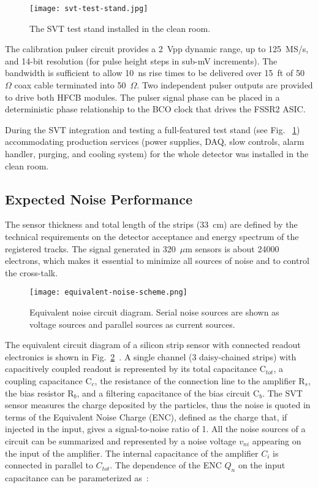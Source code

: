\begin{figure}[hbt] 
\centering 
\texttt{[image: svt-test-stand.jpg]}
\caption{The SVT test stand installed in the clean room.}
\label{fig:svt-test-stand}
\end{figure}

The calibration pulser circuit provides a 2~Vpp dynamic range, up to 125~MS/s, and 14-bit resolution (for pulse
height steps in sub-mV increments). The bandwidth is sufficient to allow 10~ns rise times to be delivered over
15~ft of 50~$\Omega$ coax cable terminated into 50~$\Omega$. Two independent pulser outputs are provided
to drive both HFCB modules. The pulser signal phase can be placed in a deterministic phase relationship to the BCO
clock that drives the FSSR2 ASIC. 

During the SVT integration and testing a full-featured test stand (see Fig. ~\ref{fig:svt-test-stand}) accommodating
production services (power supplies, DAQ, slow controls, alarm handler, purging, and cooling system) for the whole
detector was installed in the clean room.

\subsection{Expected Noise Performance}

The sensor thickness and total length of the strips (33~cm) are defined by the technical requirements on the
detector acceptance and energy spectrum of the registered tracks. The signal generated in 320~$\mu$m sensors
is about 24000 electrons, which makes it essential to minimize all sources of noise and to control the cross-talk. 

\begin{figure}[hbt] 
\centering 
\texttt{[image: equivalent-noise-scheme.png]}
\caption{Equivalent noise circuit diagram. Serial noise sources are shown as voltage sources and
parallel sources as current sources.}
\label{fig:equivalent-noise-scheme}
\end{figure}

The equivalent circuit diagram of a silicon strip sensor with connected readout electronics is shown in
Fig.~\ref{fig:equivalent-noise-scheme}~\cite{SPIELER}. A single channel (3 daisy-chained strips) with capacitively
coupled readout is represented by its total capacitance C$_{tot}$, a coupling capacitance C$_c$, the resistance of
the connection line to the amplifier R$_s$, the bias resistor R$_b$, and a filtering capacitance of the bias circuit
C$_b$. The SVT sensor measures the charge deposited by the particles, thus the noise is quoted in terms of the
Equivalent Noise Charge (ENC), defined as the charge that, if injected in the input, gives a signal-to-noise ratio of 1.
All the noise sources of a circuit can be summarized and represented by a noise voltage $v_{ni}$ appearing on the
input of the amplifier. The internal capacitance of the amplifier $C_i$ is connected in parallel to $C_{tot}$. The
dependence of the ENC $Q_n$ on the input capacitance can be parameterized as~\cite{BLOCHTHESIS}:

